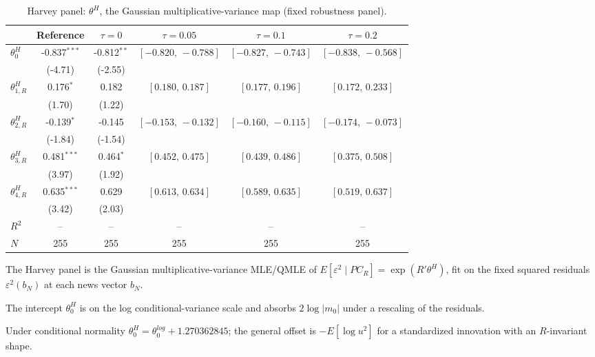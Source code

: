 \begin{table}[!htbp]
\centering
\begin{threeparttable}
\caption{Harvey panel: $\theta^{H}$, the Gaussian multiplicative-variance map (fixed robustness panel).}
\label{tab:log_var_eq_panel_harvey}
\footnotesize\setlength{\tabcolsep}{3pt}
\begin{tabular}{lccccc}
\toprule
 & Reference & $\tau{=}0$ & $\tau{=}0.05$ & $\tau{=}0.1$ & $\tau{=}0.2$ \\
\midrule
$\theta^{H}_0$ & -0.837$^{***}$ & -0.812$^{**}$ & $[-0.820,\,-0.788]$ & $[-0.827,\,-0.743]$ & $[-0.838,\,-0.568]$ \\
 & (-4.71) & (-2.55) &  &  &  \\
\midrule
$\theta^{H}_{1,R}$ & 0.176$^{*}$ & 0.182 & $[0.180,\,0.187]$ & $[0.177,\,0.196]$ & $[0.172,\,0.233]$ \\
 & (1.70) & (1.22) &  &  &  \\
$\theta^{H}_{2,R}$ & -0.139$^{*}$ & -0.145 & $[-0.153,\,-0.132]$ & $[-0.160,\,-0.115]$ & $[-0.174,\,-0.073]$ \\
 & (-1.84) & (-1.54) &  &  &  \\
$\theta^{H}_{3,R}$ & 0.481$^{***}$ & 0.464$^{*}$ & $[0.452,\,0.475]$ & $[0.439,\,0.486]$ & $[0.375,\,0.508]$ \\
 & (3.97) & (1.92) &  &  &  \\
$\theta^{H}_{4,R}$ & 0.635$^{***}$ & 0.629 & $[0.613,\,0.634]$ & $[0.589,\,0.635]$ & $[0.519,\,0.637]$ \\
 & (3.42) & (2.03) &  &  &  \\
$R^2$ & -- & -- & -- & -- & -- \\
$N$ & 255 & 255 & 255 & 255 & 255 \\
\bottomrule
\end{tabular}
\begin{tablenotes}[flushleft]
\scriptsize
\item The Harvey panel is the Gaussian multiplicative-variance MLE/QMLE of $E[\varepsilon^2 \mid PC_R] = \exp(R'\theta^{H})$, fit on the fixed squared residuals $\varepsilon^2(b_N)$ at each news vector $b_N$.
\item The intercept $\theta^{H}_0$ is on the log conditional-variance scale and absorbs $2\log|m_0|$ under a rescaling of the residuals.
\item Under conditional normality $\theta^{H}_0 = \theta^{log}_0 + 1.270362845$; the general offset is $-E[\log u^2]$ for a standardized innovation with an $R$-invariant shape.

\end{tablenotes}
\end{threeparttable}
\end{table}
